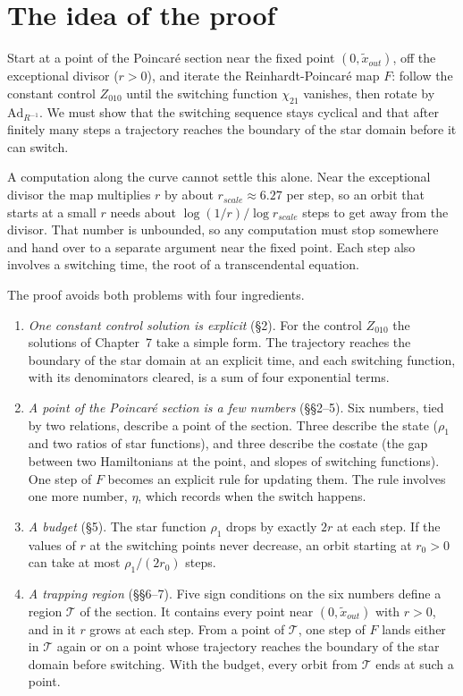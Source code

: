 \documentclass[11pt,a4paper]{article}
\theoremstyle{plain}
\theoremstyle{definition}
\theoremstyle{remark}
\newcommand{\Ad}{\mathrm{Ad}}
\newcommand{\rs}{r_{scale}}
\newcommand{\T}{\mathcal{T}}
\begin{document}
\section*{The idea of the proof}

Start at a point of the Poincar\'e section near the fixed point $(0,\tilde x_{out})$, off the
exceptional divisor ($r>0$), and iterate the Reinhardt-Poincar\'e map $F$: follow the constant
control $Z_{010}$ until the switching function $\chi_{21}$ vanishes, then rotate by $\Ad_{R^{-1}}$.
We must show that the switching sequence stays cyclical and that after finitely many steps a
trajectory reaches the boundary of the star domain before it can switch.

A computation along the curve cannot settle this alone. Near the exceptional divisor the map
multiplies $r$ by about $\rs\approx6.27$ per step, so an orbit that starts at a small $r$ needs
about $\log(1/r)/\log\rs$ steps to get away from the divisor. That number is unbounded, so any
computation must stop somewhere and hand over to a separate argument near the fixed point. Each
step also involves a switching time, the root of a transcendental equation.

The proof avoids both problems with four ingredients.

\begin{enumerate}[leftmargin=*,itemsep=3pt]
\item \emph{One constant control solution is explicit} (\S2). For the control $Z_{010}$ the
solutions of Chapter~7 take a simple form. The trajectory reaches the boundary of the star domain
at an explicit time, and each switching function, with its denominators cleared, is a sum of four
exponential terms.
\item \emph{A point of the Poincar\'e section is a few numbers} (\S\S2--5). Six numbers, tied by
two relations, describe a point of the section. Three describe the state ($\rho_1$ and two ratios
of star functions), and three describe the costate (the gap between two Hamiltonians at the point,
and slopes of switching functions). One step of $F$ becomes an explicit rule for updating them.
The rule involves one more number, $\eta$, which records when the switch happens.
\item \emph{A budget} (\S5). The star function $\rho_1$ drops by exactly $2r$ at each step. If
the values of $r$ at the switching points never decrease, an orbit starting at $r_0>0$ can take
at most $\rho_1/(2r_0)$ steps.
\item \emph{A trapping region} (\S\S6--7). Five sign conditions on the six numbers define a
region $\T$ of the section. It contains every point near $(0,\tilde x_{out})$ with $r>0$, and in
it $r$ grows at each step. From a point of $\T$, one step of $F$ lands either in $\T$ again or on a
point whose trajectory reaches the boundary of the star domain before switching. With the budget,
every orbit from $\T$ ends at such a point.
\end{enumerate}
\end{document}
